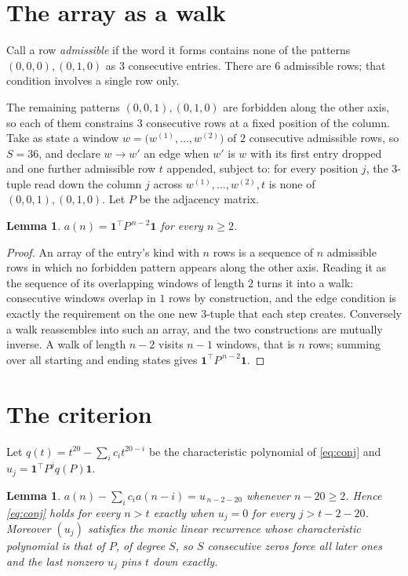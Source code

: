 \documentclass[11pt,a4paper]{article}
\theoremstyle{plain}
\newtheorem{lemma}[theorem]{Lemma}
\theoremstyle{definition}
\begin{document}
\section{The array as a walk}

Call a row \emph{admissible} if the word it forms contains none of the patterns
$(0,0,0), (0,1,0)$ as $3$ consecutive entries. There are $6$ admissible rows; that condition
involves a single row only.

The remaining patterns $(0,0,1), (0,1,0)$ are forbidden along the other axis, so each of them
constrains $3$ consecutive rows at a fixed position of the column. Take as state a
window $w=\bigl(w^{(1)},\dots,w^{(2)}\bigr)$ of $2$ consecutive admissible
rows, so $S=36$, and declare $w\to w'$ an edge when $w'$ is $w$ with its first entry
dropped and one further admissible row $t$ appended, subject to: for every position
$j$, the $3$-tuple read down the column $j$ across $w^{(1)},\dots,w^{(2)},t$
is none of $(0,0,1), (0,1,0)$. Let $P$ be the adjacency matrix.

\begin{lemma}\label{lem:walk}
$a(n)=\mathbf{1}^{\!\top}P^{\,n-2}\mathbf{1}$ for every $n\ge2$.
\end{lemma}

\begin{proof}
An array of the entry's kind with $n$ rows is a sequence of $n$ admissible rows in
which no forbidden pattern appears along the other axis. Reading it as the sequence of its
overlapping windows of length $2$ turns it into a walk: consecutive windows overlap in
$1$ rows by construction, and the edge condition is exactly the requirement on the one
new $3$-tuple that each step creates. Conversely a walk reassembles into such an array,
and the two constructions are mutually inverse. A walk of length $n-2$ visits $n-1$
windows, that is $n$ rows; summing over all starting and ending states gives
$\mathbf{1}^{\!\top}P^{\,n-2}\mathbf{1}$.
\end{proof}

\section{The criterion}

Let $q(t)=t^{20}-\sum_i c_i t^{20-i}$ be the characteristic polynomial of
\eqref{eq:conj} and $u_j=\mathbf{1}^{\!\top}P^{j}q(P)\mathbf{1}$.

\begin{lemma}\label{lem:crit}
$a(n)-\sum_i c_i a(n-i)=u_{\,n-2-20}$ whenever $n-20\ge2$. Hence
\eqref{eq:conj} holds for every $n>t$ exactly when $u_j=0$ for every
$j>t-2-20$. Moreover $(u_j)$ satisfies the monic linear recurrence whose
characteristic polynomial is that of $P$, of degree $S$, so $S$ consecutive zeros force all
later ones and the last nonzero $u_j$ pins $t$ down exactly.
\end{lemma}
\end{document}

